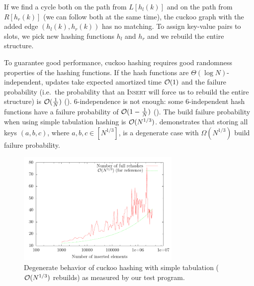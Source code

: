 If we find a cycle both on the path from $L[h_l(k)]$ and on the path from
$R[h_r(k)]$ (we can follow both at the same time), the cuckoo graph with
the added edge $(h_l(k),h_r(k))$ has no matching. To assign key-value pairs
to slots, we pick new hashing functions $h_l$ and $h_r$ and we rebuild
the entire structure.

To guarantee good performance, cuckoo hashing requires good randomness
properties of the hashing functions.
If the hash functions are $\Theta(\log N)$-independent, updates take expected
amortized time $\mathcal{O}(1)$ and the failure probability (i.e.\ the probability that
an \textsc{Insert} will force us to rebuild the entire structure) is
$\mathcal{O}(\frac{1}{N})$ (\cite{cuckoo-hashing}).
6-independence is not enough: some 6-independent hash functions have a
failure probability of $\mathcal{O}(1-\frac{1}{N})$ (\cite{cuckoo-hashing-indep-bounds}).
The build failure probability when using simple tabulation hashing is
$\mathcal{O}(N^{1/3})$. \cite{power-of-simple-tab} demonstrates that storing all keys
$(a,b,c)$, where $a,b,c\in[N^{1/3}]$, is a degenerate case with
$\Omega(N^{1/3})$ build failure probability.

\begin{figure}
	\centering
	\includegraphics[width=0.7\textwidth]{img/cuckoo/results}
	\caption{Degenerate behavior of cuckoo hashing
		with simple tabulation ($\mathcal{O}(N^{1/3})$ rebuilds)
		as measured by our test program.}
\end{figure}


